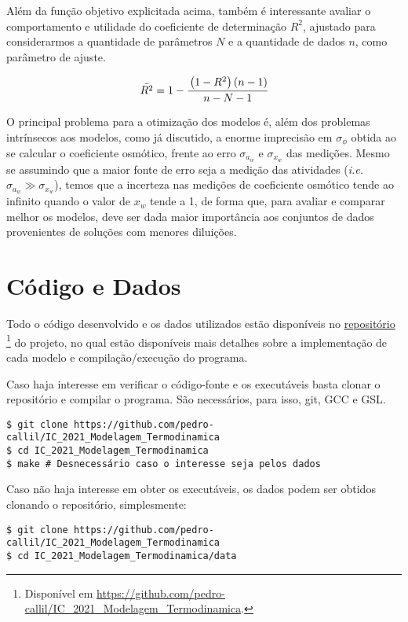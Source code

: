 \documentclass[
	12pt,				%
	openright,
	twoside,
	a4paper,			%
	english,			%
	french,				%
	spanish,			%
	brazil				%
	]{abntex2}
\begin{document}
Além da função objetivo explicitada acima, também é interessante avaliar o
comportamento e utilidade do coeficiente de determinação $R^2$, ajustado para
considerarmos a quantidade de parâmetros $N$ e a quantidade de dados $n$, como
parâmetro de ajuste.

\begin{equation}
	\bar{R^2} = 1 - \cfrac{\left( 1 - R^2 \right) \left( n - 1 \right)}
		{n - N - 1}
\end{equation}

O principal problema para a otimização dos modelos é, além dos problemas
intrínsecos aos modelos, como já discutido, a enorme imprecisão em
$\sigma_\phi$ obtida ao se calcular o coeficiente osmótico, frente ao erro
$\sigma_{a_w}$ e $\sigma_{x_w}$ das medições. Mesmo se assumindo que a maior
fonte de erro seja a medição das atividades (\textit{i.e.} $\sigma_{a_w} \gg
\sigma_{x_w}$), temos que a incerteza nas medições de coeficiente osmótico
tende ao infinito quando o valor de $x_w$ tende a 1, de forma que, para avaliar
e comparar melhor os modelos, deve ser dada maior importância aos conjuntos
de dados provenientes de soluções com menores diluições.

\chapter{Código e Dados}

Todo o código desenvolvido e os dados utilizados estão disponíveis no
\href{https://github.com/pedro-callil/IC_2021_Modelagem_Termodinamica}{repositório}
\footnote{Disponível em
	\url{https://github.com/pedro-callil/IC_2021_Modelagem_Termodinamica}.}
do projeto, no qual estão disponíveis mais detalhes sobre a implementação de
cada modelo e compilação/execução do programa.

Caso haja interesse em verificar o código-fonte e os executáveis basta clonar o
repositório e compilar o programa. São necessários, para isso, git, GCC e GSL.

\begin{verbatim}
$ git clone https://github.com/pedro-callil/IC_2021_Modelagem_Termodinamica
$ cd IC_2021_Modelagem_Termodinamica
$ make # Desnecessário caso o interesse seja pelos dados
\end{verbatim}

Caso não haja interesse em obter os executáveis, os dados podem ser obtidos
clonando o repositório, simplesmente:

\begin{verbatim}
$ git clone https://github.com/pedro-callil/IC_2021_Modelagem_Termodinamica
$ cd IC_2021_Modelagem_Termodinamica/data
\end{verbatim}
\end{document}
